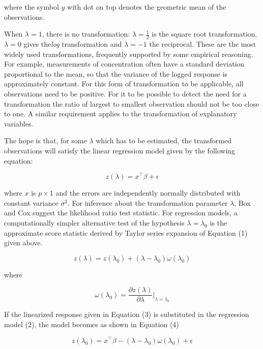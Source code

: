 \documentclass[article,shortnames,nojss]{jss}
\begin{document}
where the symbol $y$ with dot on top denotes the geometric mean of the observations.

When $\lambda=1$, there is no transformation: $\lambda=\frac{1}{2}$ is the square root transformation, $\lambda=0$ gives the\emph{log} transformation and $\lambda=-1$ the reciprocal. These are the most widely used transformations, frequently supported by some empirical reasoning. For example, measurements of concentration often have a standard deviation proportional to the mean, so that the variance of the logged response is approximately constant. For this form of transformation to be applicable, all observations need to be positive. For it to be possible to detect the need for a transformation the ratio of largest to smallest observation should not be too close to one. A similar requirement applies to the transformation of explanatory variables.

The hope is that, for some $\lambda$ which has to be estimated, the transformed observations will satisfy the linear regression model given by the following equation:

\begin{equation}
\label{eq:2}
  z(\lambda) = x^\top \beta + \epsilon
  \tag{2}
\end{equation}

where $x$ is $p\times 1$ and the errors are independently normally distributed with constant variance $\sigma^2$. For inference about the transformation parameter $\lambda$, Box and Cox suggest the likelihood ratio test statistic. For regression models, a computationally simpler alternative test of the hypothesis $\lambda=\lambda_0$ is the approximate score statistic derived by Taylor series expansion of Equation (1) given above.

\begin{equation}
\label{eq:3}
  z(\lambda) = z(\lambda_0) + (\lambda-\lambda_0) \omega(\lambda_0)
  \tag{3}
\end{equation}

where

\[
  \omega(\lambda_0) = \frac{\partial z(\lambda)}{\partial\lambda}
  \bigg\rvert_{\lambda=\lambda_0}
\]

If the linearized response given in Equation (3) is substituted in the regression model (2), the model becomes as shown in Equation (4)

\begin{equation}
\label{eq:4}
  z(\lambda_0) = x^\top \beta - (\lambda-\lambda_0) \omega(\lambda_0) + \epsilon
  \tag{4}
\end{equation}
\end{document}
